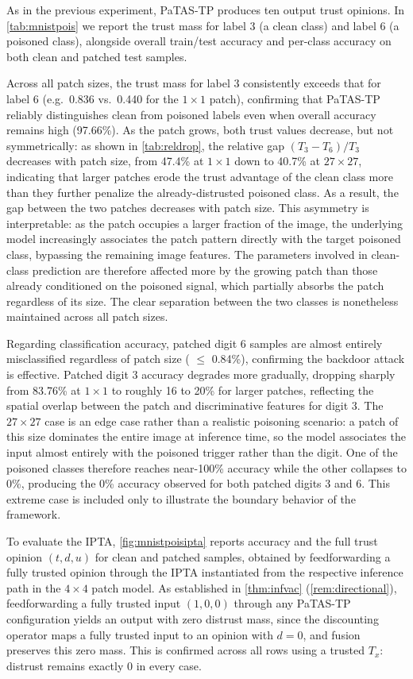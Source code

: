 As in the previous experiment, \ac{PaTAS-TP} produces ten output trust opinions. In \cref{tab:mnistpois} we report the trust mass for label 3 (a clean class) and label 6 (a poisoned class), alongside overall train/test accuracy and per-class accuracy on both clean and patched test samples.

Across all patch sizes, the trust mass for label 3 consistently exceeds that for label 6 (e.g.\ 0.836 vs.\ 0.440 for the $1\times1$ patch), confirming that \ac{PaTAS-TP} reliably distinguishes clean from poisoned labels even when overall accuracy remains high (97.66\%). As the patch grows, both trust values decrease, but not symmetrically: as shown in \cref{tab:reldrop}, the relative gap $(T_3 - T_6)/T_3$ decreases with patch size, from 47.4\% at $1\times1$ down to 40.7\% at $27\times27$, indicating that larger patches erode the trust advantage of the clean class more than they further penalize the already-distrusted poisoned class. As a result, the gap between the two patches decreases with patch size. This asymmetry is interpretable: as the patch occupies a larger fraction of the image, the underlying model increasingly associates the patch pattern directly with the target poisoned class, bypassing the remaining image features. The parameters involved in clean-class prediction are therefore affected more by the growing patch than those already conditioned on the poisoned signal, which partially absorbs the patch regardless of its size. The clear separation between the two classes is nonetheless maintained across all patch sizes.

Regarding classification accuracy, patched digit 6 samples are almost entirely misclassified regardless of patch size ( $\leq$ 0.84\%), confirming the backdoor
attack is effective. Patched digit 3 accuracy degrades more gradually, dropping
sharply from 83.76\% at $1\times1$ to roughly 16 to 20\% for larger patches,
reflecting the spatial overlap between the patch and discriminative features for
digit 3. The $27\times27$ case is an edge case rather than a realistic poisoning
scenario: a patch of this size dominates the entire image at inference time, so
the model associates the input almost entirely with the poisoned trigger rather
than the digit. One of the poisoned classes therefore reaches near-100\% accuracy
while the other collapses to 0\%, producing the 0\% accuracy observed for both
patched digits 3 and 6. This extreme case is included only to illustrate the
boundary behavior of the framework.

To evaluate the \ac{IPTA}, \cref{fig:mnistpoisipta} reports accuracy and the full trust opinion $(t, d, u)$ for clean and patched samples, obtained by feedforwarding a fully trusted opinion through the \ac{IPTA} instantiated from the respective inference path in the $4\times 4$ patch model. As established in \cref{thm:infvac} (\cref{rem:directional}), feedforwarding a fully trusted input $(1, 0, 0)$ through any \ac{PaTAS-TP} configuration yields an output with zero distrust mass, since the discounting operator maps a fully trusted input to an opinion with $d=0$, and fusion preserves this zero mass. This is confirmed across all rows using a trusted $T_x$: distrust remains exactly 0 in every case.

